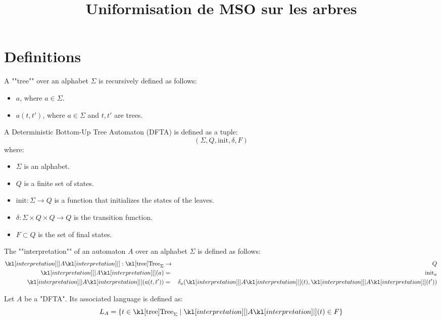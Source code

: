 \documentclass{article}
\begin{document}
\title{Uniformisation de MSO sur les arbres}

\maketitle

\section{Definitions}


\begin{definition}[Tree]
	A ""tree"" over an alphabet $\Sigma$ is recursively defined as follows:
	\begin{itemize}
		\item $a$, where $a \in \Sigma$.
		\item $a(t,t')$, where $a \in \Sigma$ and $t, t'$ are trees.
	\end{itemize}
\end{definition}

\begin{definition}
	A Deterministic Bottom-Up Tree Automaton (DFTA) is defined as a tuple:
	$$ (\Sigma, Q, \text{init}, \delta, F) $$
	where:
	\begin{itemize}
		\item $\Sigma$ is an alphabet.
		\item $Q$ is a finite set of states.
		\item $\text{init} : \Sigma \to Q$ is a function that initializes the states of the leaves.
		\item $\delta: \Sigma \times Q \times Q \to Q$ is the transition function.
		\item $F \subset Q$ is the set of final states.
	\end{itemize}
\end{definition}

\begin{definition}
	The ""interpretation"" of an automaton $A$ over an alphabet $\Sigma$ is defined as follows:
	\begin{eqnarray*}
		\interpret A : \tree_{\Sigma} &\to& Q \\
		\interpret A (a) &=& \text{init}_a \\
		\interpret A (a(t,t')) &=& \delta_a (\interpret A (t), \interpret A (t'))
	\end{eqnarray*}
\end{definition}

\begin{definition}
	Let $A$ be a "DFTA". Its associated language is defined as:
	$$L_A = \setdef {t \in \tree_{\Sigma}} {\interpret A (t) \in F}$$
\end{definition}



\end{document}
